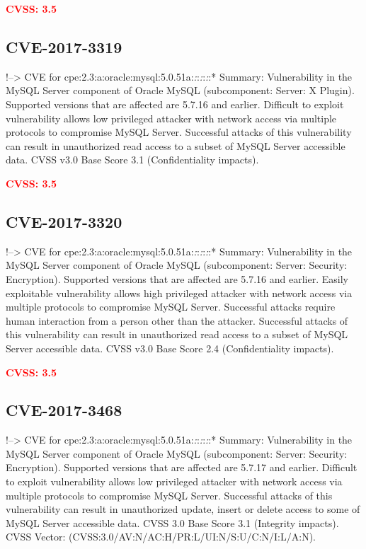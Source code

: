 \documentclass[a4paper, 12pt]{article}
\begin{document}
\textbf{\textcolor{red}{CVSS: 3.5}}

\hypertarget{cve-2017-3319}{%
\subsection{CVE-2017-3319}\label{cve-2017-3319}}

!--\textgreater{} CVE for
cpe:2.3:a:oracle:mysql:5.0.51a:\emph{:}:\emph{:}:\emph{:}:* Summary:
Vulnerability in the MySQL Server component of Oracle MySQL
(subcomponent: Server: X Plugin). Supported versions that are affected
are 5.7.16 and earlier. Difficult to exploit vulnerability allows low
privileged attacker with network access via multiple protocols to
compromise MySQL Server. Successful attacks of this vulnerability can
result in unauthorized read access to a subset of MySQL Server
accessible data. CVSS v3.0 Base Score 3.1 (Confidentiality impacts).

\textbf{\textcolor{red}{CVSS: 3.5}}

\hypertarget{cve-2017-3320}{%
\subsection{CVE-2017-3320}\label{cve-2017-3320}}

!--\textgreater{} CVE for
cpe:2.3:a:oracle:mysql:5.0.51a:\emph{:}:\emph{:}:\emph{:}:* Summary:
Vulnerability in the MySQL Server component of Oracle MySQL
(subcomponent: Server: Security: Encryption). Supported versions that
are affected are 5.7.16 and earlier. Easily exploitable vulnerability
allows high privileged attacker with network access via multiple
protocols to compromise MySQL Server. Successful attacks require human
interaction from a person other than the attacker. Successful attacks of
this vulnerability can result in unauthorized read access to a subset of
MySQL Server accessible data. CVSS v3.0 Base Score 2.4 (Confidentiality
impacts).

\textbf{\textcolor{red}{CVSS: 3.5}}

\hypertarget{cve-2017-3468}{%
\subsection{CVE-2017-3468}\label{cve-2017-3468}}

!--\textgreater{} CVE for
cpe:2.3:a:oracle:mysql:5.0.51a:\emph{:}:\emph{:}:\emph{:}:* Summary:
Vulnerability in the MySQL Server component of Oracle MySQL
(subcomponent: Server: Security: Encryption). Supported versions that
are affected are 5.7.17 and earlier. Difficult to exploit vulnerability
allows low privileged attacker with network access via multiple
protocols to compromise MySQL Server. Successful attacks of this
vulnerability can result in unauthorized update, insert or delete access
to some of MySQL Server accessible data. CVSS 3.0 Base Score 3.1
(Integrity impacts). CVSS Vector:
(CVSS:3.0/AV:N/AC:H/PR:L/UI:N/S:U/C:N/I:L/A:N).
\end{document}
